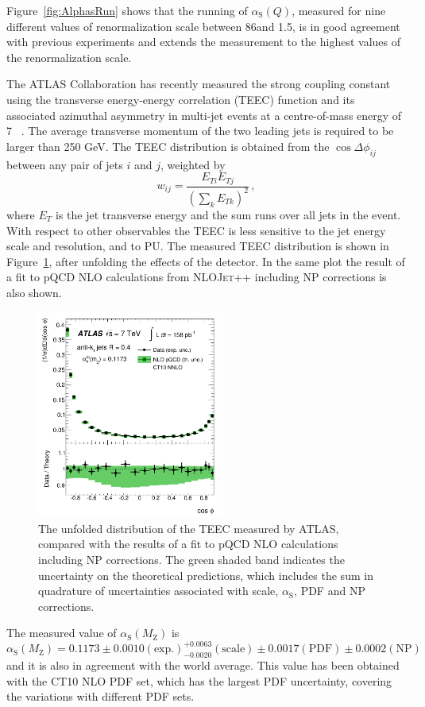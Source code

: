 \documentclass{PoS}
\providecommand{\NLOJETPP} {{\textsc{NLOJet++}}\xspace}
\def\as{\ensuremath{\alpha_\mathrm{S}}\xspace}
\def\asq{\ensuremath{\alpha_\mathrm{S}(Q)}\xspace}
\providecommand{\alpsmz}{\ensuremath{\alpha_\mathrm{S}(M_\mathrm{Z})}\xspace}
\begin{document}
Figure~\ref{fig:AlphasRun} shows that the running of \asq, measured for nine different values of renormalization scale 
between 86\GeV and 1.5\TeV, is in good agreement with previous experiments and extends the measurement to the highest
values of the renormalization scale.

The ATLAS Collaboration has recently measured the strong coupling constant using the transverse energy-energy
correlation (TEEC) function and its associated azimuthal asymmetry in multi-jet events at a
centre-of-mass energy of 7 \TeV~\cite{ATLAS:2015yaa}. The average transverse momentum of the two leading jets is
required to be larger than 250 GeV. The TEEC distribution is obtained from the $\cos\Delta\phi_{ij}$ between any pair of
jets $i$ and $j$, weighted by $$w_{ij} = \frac{E_{Ti}E_{Tj}}{(\sum_k E_{Tk})^2} \, ,$$ where $E_T$ is the jet transverse
energy and the sum runs over all jets in the event. With respect to other observables the TEEC is less sensitive to the jet energy scale and resolution,
and to PU. The measured TEEC distribution is shown in Figure~\ref{fig:TEEC}, after unfolding the effects of
the detector. In the same plot the result of a fit to pQCD NLO calculations from \NLOJETPP including NP
corrections is also shown. 
\begin{figure}[tpb]
  \centering
  \includegraphics[width=0.55\textwidth]{Figure5.pdf}
  \caption{The unfolded distribution of the TEEC measured by ATLAS, compared with the results of a fit to
    pQCD NLO calculations including NP corrections. The green shaded band indicates the uncertainty on the
    theoretical predictions, which includes the sum in quadrature of uncertainties associated with scale, \as, PDF and
    NP corrections.}
  \label{fig:TEEC}
\end{figure}
The measured value of \alpsmz is 
$$ \alpsmz  = 0.1173 \pm 0.0010 \mathrm{(exp.)} ^{+0.0063}_{-0.0020} \mathrm{(scale)} \pm 0.0017 \mathrm{(PDF)} \pm
0.0002 \mathrm{(NP)} \, $$
and it is also in agreement with the world average. This value has been obtained with the CT10 NLO PDF set, which has
the largest PDF uncertainty, covering the variations with different PDF sets.
\end{document}
